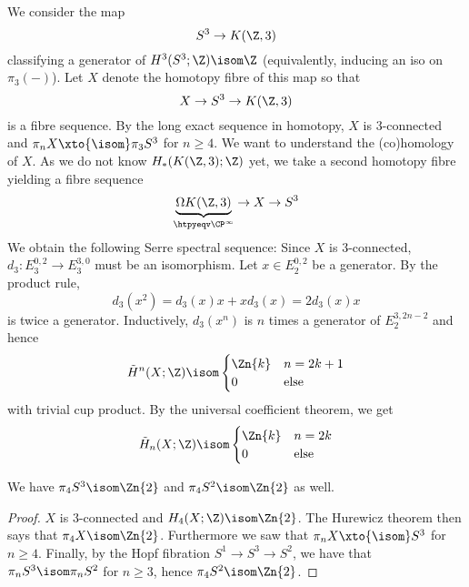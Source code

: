 \documentclass[wip, topology]{bsteffan-lecturenotes}
\begin{document}
\begin{example}
	We consider the map
	\begin{equation*}
		S^3 \to K(\Z, 3)
	\end{equation*}
	classifying a generator of $H^3(S^3; \Z) \isom \Z$ (equivalently, inducing an iso on $\pi_3({{-}})$).
	Let $X$ denote the homotopy fibre of this map so that 
	\begin{equation*}
		X \to S^3 \to K(\Z, 3)
	\end{equation*}
	is a fibre sequence.
	By the long exact sequence in homotopy, $X$ is 3-connected and $\pi_n X \xto{\isom} \pi_3 S^3$ for $n \geq 4$. 
	We want to understand the (co)homology of $X$.
	As we do not know $H_*(K(\Z, 3); \Z)$ yet, we take a second homotopy fibre yielding a fibre sequence
	\begin{equation*}
		\underbrace{\Omega K(\Z, 3)}_{\htpyeqv \CP^\infty} \to X \to S^3
	\end{equation*}
	We obtain the following Serre spectral sequence:
	Since $X$ is 3-connected, $d_3\colon E_3^{0, 2} \to E_3^{3, 0}$ must be an isomorphism.
	Let $x \in E_2^{0, 2}$ be a generator.
	By the product rule,
	\begin{equation*}
		d_3(x^2) = d_3(x) x + x d_3(x) = 2 d_3(x)x
	\end{equation*}
	is twice a generator.
	Inductively, $d_3(x^n)$ is $n$ times a generator of $E_2^{3, 2n - 2}$ and hence
	\begin{equation*}
		\tilde{H}^n(X; \Z) \isom \begin{cases}
			\Zn{k}  & n = 2k + 1 \\
			0 		& \text{else}
		\end{cases}
	\end{equation*}
	with trivial cup product.
	By the universal coefficient theorem, we get
	\begin{equation*}
		\tilde{H}_n(X; \Z) \isom \begin{cases}
			\Zn{k} 	& n = 2k \\
			0 	  	& \text{else}
		\end{cases}
	\end{equation*}
\end{example}
\begin{corollary}
	We have $\pi_4 S^3 \isom \Zn{2}$ and $\pi_4 S^2 \isom \Zn{2}$ as well.
\end{corollary}
\begin{proof}
	$X$ is 3-connected and $H_4(X; \Z) \isom \Zn{2}$.
	The Hurewicz theorem then says that $\pi_4 X \isom \Zn{2}$.
	Furthermore we saw that $\pi_n X \xto{\isom} S^3$ for $n \geq 4$.
	Finally, by the Hopf fibration $S^1 \to S^3 \to S^2$, we have that $\pi_n S^3 \isom \pi_n S^2$ for $n \geq 3$, hence $\pi_4 S^2 \isom \Zn{2}$.
\end{proof}
\end{document}
